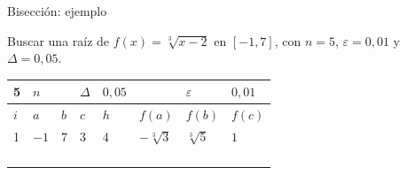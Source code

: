 \documentclass[original_version/main.tex]{subfiles}
\begin{document}
\begin{frame}[t]{Bisección: ejemplo}
\begin{minipage}[t][13mm][t]{\textwidth}\small Buscar una raíz de $f(x)=\sqrt[3]{x-2}$ en $[-1,7]$, con $n=5$, $\varepsilon=0{,}01$ y $\Delta=0{,}05$.\end{minipage}\par{\scriptsize\setlength{\tabcolsep}{2pt}\renewcommand{\arraystretch}{1}\begin{center}\begin{tabular}{|C{.04\textwidth}|C{.112\textwidth}|C{.112\textwidth}|C{.112\textwidth}|C{.112\textwidth}|C{.112\textwidth}|C{.112\textwidth}|C{.112\textwidth}|}
\hline
\rule{0pt}{4.3mm}5 & $n$ &  &  $\Delta$  & $0{,}05$ &  & $\varepsilon$ & $0{,}01$\\\hline
\rule{0pt}{4.3mm}$i$ & $a$ & $b$ & $c$ & $h$ & $f(a)$ & $f(b)$ & $f(c)$\\\hline
\rule{0pt}{4.3mm}1 & $-1$ & $7$ & $3$ & $4$ & $-\sqrt[3]3$ & $\sqrt[3]5$ & $1$\\\hline
\rule{0pt}{4.3mm} &  &  &  &  &  &  & \\\hline
\rule{0pt}{4.3mm} &  &  &  &  &  &  & \\\hline
\rule{0pt}{4.3mm} &  &  &  &  &  &  & \\\hline
\rule{0pt}{4.3mm} &  &  &  &  &  &  & \\\hline
\end{tabular}\end{center}}\begin{minipage}[t][10mm][t]{\textwidth}\footnotesize \end{minipage}
\end{frame}
\end{document}
